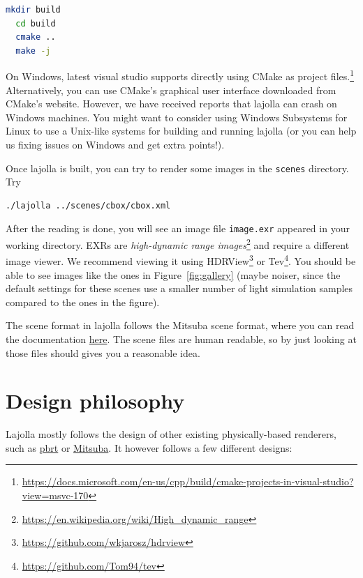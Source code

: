 \documentclass{article}
\begin{document}
\begin{lstlisting}[language=bash]
  mkdir build
  cd build
  cmake ..
  make -j
\end{lstlisting}

On Windows, latest visual studio supports directly using CMake as project files.\footnote{\url{https://docs.microsoft.com/en-us/cpp/build/cmake-projects-in-visual-studio?view=msvc-170}} Alternatively, you can use CMake's graphical user interface downloaded from CMake's website. However, we have received reports that lajolla can crash on Windows machines. You might want to consider using Windows Subsystems for Linux to use a Unix-like systems for building and running lajolla (or you can help us fixing issues on Windows and get extra points!). 

Once lajolla is built, you can try to render some images in the \lstinline{scenes} directory. Try
\begin{lstlisting}[language=bash]
  ./lajolla ../scenes/cbox/cbox.xml
\end{lstlisting}

After the reading is done, you will see an image file \lstinline{image.exr} appeared in your working directory. EXRs are \emph{high-dynamic range images}\footnote{\url{https://en.wikipedia.org/wiki/High_dynamic_range}} and require a different image viewer. We recommend viewing it using HDRView\footnote{\url{https://github.com/wkjarosz/hdrview}} or Tev\footnote{\url{https://github.com/Tom94/tev}}. You should be able to see images like the ones in Figure~\ref{fig:gallery} (maybe noiser, since the default settings for these scenes use a smaller number of light simulation samples compared to the ones in the figure).

The scene format in lajolla follows the Mitsuba scene format, where you can read the documentation \href{https://www.mitsuba-renderer.org/releases/current/documentation.pdf}{here}. The scene files are human readable, so by just looking at those files should gives you a reasonable idea.

\section{Design philosophy}

Lajolla mostly follows the design of other existing physically-based renderers, such as \href{https://github.com/mmp/pbrt-v3/}{pbrt} or \href{http://www.mitsuba-renderer.org/}{Mitsuba}. It however follows a few different designs:
\end{document}
